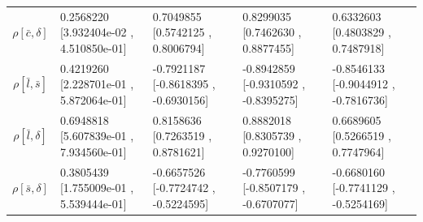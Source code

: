 \begin{center}
\begin{tabular}{|c|p{3.7cm}|p{3.7cm}|p{3.7cm}|p{3.7cm}|}
$\rho[\bar{c},\delta]$&0.2568220 [3.932404e-02 , 4.510850e-01]&0.7049855 [0.5742125 , 0.8006794]&0.8299035 [0.7462630 , 0.8877455]&0.6332603 [0.4803829 , 0.7487918]\\
$\rho[\bar{l},\bar{s}]$&0.4219260 [2.228701e-01 , 5.872064e-01]&-0.7921187 [-0.8618395 , -0.6930156]&-0.8942859 [-0.9310592 , -0.8395275]&-0.8546133 [-0.9044912 , -0.7816736]\\
$\rho[\bar{l},\delta]$&0.6948818 [5.607839e-01 , 7.934560e-01]&0.8158636 [0.7263519 , 0.8781621]&0.8882018 [0.8305739 , 0.9270100]&0.6689605 [0.5266519 , 0.7747964]\\
$\rho[\bar{s},\delta]$&0.3805439 [1.755009e-01 , 5.539444e-01]&-0.6657526 [-0.7724742 , -0.5224595]&-0.7760599 [-0.8507179 , -0.6707077]&-0.6680160 [-0.7741129 , -0.5254169]\\\hline
\end{tabular}



\end{center}
